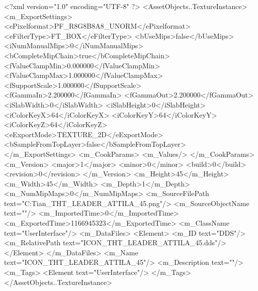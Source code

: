 <?xml version="1.0" encoding="UTF-8" ?>
<AssetObjects..TextureInstance>
	<m_ExportSettings>
		<ePixelformat>PF_R8G8B8A8_UNORM</ePixelformat>
		<eFilterType>FT_BOX</eFilterType>
		<bUseMips>false</bUseMips>
		<iNumManualMips>0</iNumManualMips>
		<bCompleteMipChain>true</bCompleteMipChain>
		<fValueClampMin>0.000000</fValueClampMin>
		<fValueClampMax>1.000000</fValueClampMax>
		<fSupportScale>1.000000</fSupportScale>
		<fGammaIn>2.200000</fGammaIn>
		<fGammaOut>2.200000</fGammaOut>
		<iSlabWidth>0</iSlabWidth>
		<iSlabHeight>0</iSlabHeight>
		<iColorKeyX>64</iColorKeyX>
		<iColorKeyY>64</iColorKeyY>
		<iColorKeyZ>64</iColorKeyZ>
		<eExportMode>TEXTURE_2D</eExportMode>
		<bSampleFromTopLayer>false</bSampleFromTopLayer>
	</m_ExportSettings>
	<m_CookParams>
		<m_Values/>
	</m_CookParams>
	<m_Version>
		<major>1</major>
		<minor>0</minor>
		<build>0</build>
		<revision>0</revision>
	</m_Version>
	<m_Height>45</m_Height>
	<m_Width>45</m_Width>
	<m_Depth>1</m_Depth>
	<m_NumMipMaps>0</m_NumMipMaps>
	<m_SourceFilePath text="C:\Users\Troy Tian\Downloads\ICON_THT_LEADER_ATTILA_45.png"/>
	<m_SourceObjectName text=""/>
	<m_ImportedTime>0</m_ImportedTime>
	<m_ExportedTime>1166945323</m_ExportedTime>
	<m_ClassName text="UserInterface"/>
	<m_DataFiles>
		<Element>
			<m_ID text="DDS"/>
			<m_RelativePath text="ICON_THT_LEADER_ATTILA_45.dds"/>
		</Element>
	</m_DataFiles>
	<m_Name text="ICON_THT_LEADER_ATTILA_45"/>
	<m_Description text=""/>
	<m_Tags>
		<Element text="UserInterface"/>
	</m_Tags>
</AssetObjects..TextureInstance>

